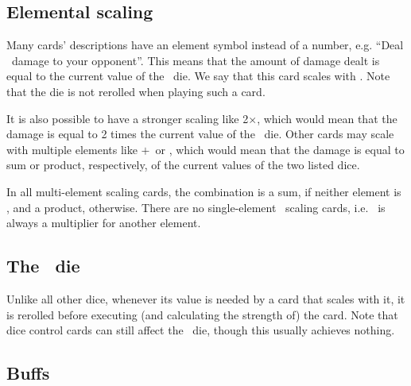 \documentclass[dvipsnames,parskip,a4paper]{scrartcl}
\newcommand{\iconsize}{3.4mm}
\newcommand{\icondepth}{0.45mm}
\newcommand{\icon}[1]{\raisebox{-\icondepth}{\texttt{[image:  \#1 ]}}}
\newcommand{\chance}{\icon{icons/chance.png}}
\newcommand{\fire}{\icon{icons/fire.png}}
\newcommand{\earth}{\icon{icons/earth.png}}
\newcommand{\water}{\icon{icons/water.png}}
\newcommand{\magic}{\icon{icons/magic.png}}
\begin{document}
\subsection*{Elemental scaling}

Many cards' descriptions have an element symbol instead of a number, e.g. ``Deal \fire \ damage to your opponent''. This means that the amount of damage dealt is equal to the current value of the \fire \ die. We say that this card scales with \fire. Note that the die is not rerolled when playing such a card.

\vspace{4pt}

It is also possible to have a stronger scaling like 2\hspace{1pt}$\times$\hspace{1pt}\fire, which would mean that the damage is equal to 2 times the current value of the \fire \ die. Other cards may scale with multiple elements like \earth\hspace{1pt}$+$\hspace{1pt}\chance \ or \water\hspace{1pt}\times\hspace{1pt}\magic, which would mean that the damage is equal to sum or product, respectively, of the current values of the two listed dice.

\vspace{4pt}

In all multi-element scaling cards, the combination is a sum, if neither element is \magic, and a product, otherwise. There are no single-element \magic \ scaling cards, i.e. \magic \ is always a multiplier for another element.

\vspace{4pt}

\subsection*{The \chance \ die}

Unlike all other dice, whenever its value is needed by a card that scales with it, it is rerolled before executing (and calculating the strength of) the card. Note that dice control cards can still affect the \chance \ die, though this usually achieves nothing.

\subsection*{Buffs}
\end{document}
